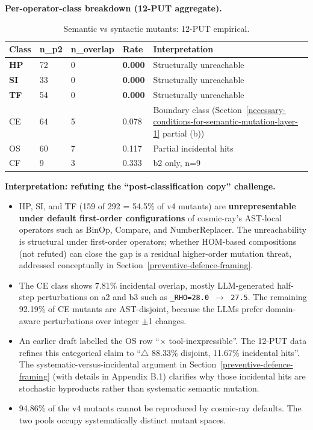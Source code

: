 \documentclass[manuscript,screen,review]{acmart}
\begin{document}
\textbf{Per-operator-class breakdown (12-PUT aggregate).}

{%
\begin{longtable}[]{@{}lllll@{}}
\caption{Semantic vs syntactic mutants: 12-PUT empirical.}\label{tab:p2-05}\\
\toprule\noalign{}
Class & n\_p2 & n\_overlap & Rate & Interpretation \\
\midrule\noalign{}
\endfirsthead
\endhead
\bottomrule\noalign{}
\endlastfoot
\textbf{HP} & 72 & 0 & \textbf{0.000} & Structurally unreachable \\
\textbf{SI} & 33 & 0 & \textbf{0.000} & Structurally unreachable \\
\textbf{TF} & 54 & 0 & \textbf{0.000} & Structurally unreachable \\
CE & 64 & 5 & 0.078 & Boundary class (Section~\ref{necessary-conditions-for-semantic-mutation-layer-1} partial (b)) \\
OS & 60 & 7 & 0.117 & Partial incidental hits \\
CF & 9 & 3 & 0.333 & b2 only, n=9 \\
\end{longtable}
}

\textbf{Interpretation: refuting the ``post-classification copy''
challenge.}

\begin{itemize}

\item
  HP, SI, and TF (159 of 292 = 54.5\% of v4 mutants) are
  \textbf{unrepresentable under default first-order configurations} of
  cosmic-ray's AST-local operators such as BinOp, Compare, and
  NumberReplacer. The unreachability is structural under first-order
  operators; whether HOM-based compositions \citep{jia2008subtle} (not
  refuted) can close the gap is a residual higher-order mutation threat, addressed
  conceptually in Section~\ref{preventive-defence-framing}.
\item
  The CE class shows 7.81\% incidental overlap, mostly LLM-generated
  half-step perturbations on a2 and b3 such as
  \texttt{\_RHO=28.0\ $\to$\ 27.5}. The remaining 92.19\% of CE mutants are
  AST-disjoint, because the LLMs prefer domain-aware perturbations over
  integer $\pm$1 changes.
\item
  An earlier draft labelled the OS row ``$\times$ tool-inexpressible''. The
  12-PUT data refines this categorical claim to ``$\bigtriangleup$ 88.33\% disjoint,
  11.67\% incidental hits''. The systematic-versus-incidental argument
  in Section~\ref{preventive-defence-framing} (with details in Appendix B.1) clarifies why those
  incidental hits are stochastic byproducts rather than systematic
  semantic mutation.
\item
  94.86\% of the v4 mutants cannot be reproduced by cosmic-ray defaults.
  The two pools occupy systematically distinct mutant spaces.
\end{itemize}
\end{document}
